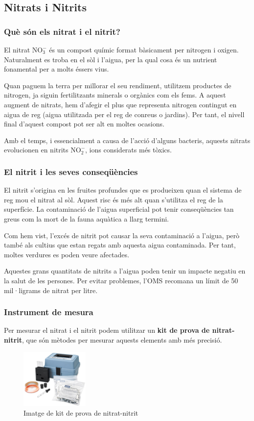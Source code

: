 \subsection{Nitrats i Nitrits} \label{subsec:nitratsnitrits}
\subsubsection{Què són els nitrat i el nitrit?}
El nitrat \(\mathrm{NO_3^-}\) és un compost químic format bàsicament per nitrogen i oxigen. Naturalment es troba en el sòl i l'aigua, per la qual cosa és un nutrient fonamental per a molts éssers vius.

Quan paguem la terra per millorar el seu rendiment, utilitzem productes de nitrogen, ja siguin fertilitzants minerals o orgànics com els fems. A aquest augment de nitrats, hem d'afegir el plus que representa nitrogen contingut en aigua de reg (aigua utilitzada per el reg de conreus o jardins). Per tant, el nivell final d'aquest compost pot ser alt en moltes ocasions.

Amb el temps, i essencialment a causa de l'acció d'alguns bacteris, aquests nitrats evolucionen en nitrits \(\mathrm{NO_2^-}\), ions considerats més tòxics.
\subsubsection{El nitrit i les seves conseqüències}
El nitrit s'origina en les fruites profundes que es produeixen quan el sistema de reg mou el nitrat al sòl. Aquest risc és més alt quan s'utilitza el reg de la superfície. La contaminació de l'aigua superficial pot tenir conseqüències tan greus com la mort de la fauna aquàtica a llarg termini.

Com hem vist, l'excés de nitrit pot causar la seva contaminació a l'aigua, però també als cultius que estan regats amb aquesta aigua contaminada. Per tant, moltes verdures es poden veure afectades.

Aquestes grans quantitats de nitrits a l'aigua poden tenir un impacte negatiu en la salut de les persones. Per evitar problemes, l'OMS recomana un límit de 50 mil·ligrams de nitrat per litre. \cite{OMS}
\subsubsection{Instrument de mesura}
Per mesurar el nitrat i el nitrit podem utilitzar un \textbf{kit de prova de nitrat-nitrit}, que són mètodes per mesurar aquests elements amb més precisió.
\begin{figure}[H]
\centering
\includegraphics[width=0.3\textwidth]{./Figures/nitratnitrit.png}
\caption{Imatge de kit de prova de nitrat-nitrit}
\label{fig:kitnitrats}
\end{figure}

